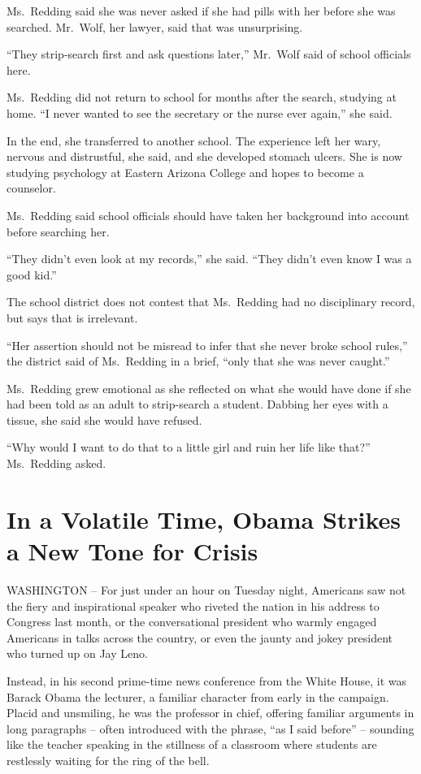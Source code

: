 \documentclass[12pt,a4paper,onecolumn]{article}
\begin{document}
\begin{CJK*}{GBK}{song}
Ms.~Redding said she was never asked if she had pills with her before she was searched. Mr.~Wolf,
her lawyer, said that was unsurprising.

``They strip-search first and ask questions later,'' Mr.~Wolf said of school officials here.

Ms.~Redding did not return to school for months after the search, studying at home. ``I never wanted
to see the secretary or the nurse ever again,'' she said.

In the end, she transferred to another school. The experience left her wary, nervous and
distrustful, she said, and she developed stomach ulcers. She is now studying psychology at Eastern
Arizona College and hopes to become a counselor.

Ms.~Redding said school officials should have taken her background into account before searching
her.

``They didn't even look at my records,'' she said. ``They didn't even know I was a good kid.''

The school district does not contest that Ms.~Redding had no disciplinary record, but says that is
irrelevant.

``Her assertion should not be misread to infer that she never broke school rules,'' the district
said of Ms.~Redding in a brief, ``only that she was never caught.''

Ms.~Redding grew emotional as she reflected on what she would have done if she had been told as an
adult to strip-search a student. Dabbing her eyes with a tissue, she said she would have refused.

``Why would I want to do that to a little girl and ruin her life like that?'' Ms.~Redding asked.

\section{In a Volatile Time, Obama Strikes a New Tone for Crisis}

WASHINGTON -- For just under an hour on Tuesday night, Americans saw not the fiery and inspirational
speaker who riveted the nation in his address to Congress last month, or the conversational
president who warmly engaged Americans in talks across the country, or even the jaunty and jokey
president who turned up on Jay Leno.

Instead, in his second prime-time news conference from the White House, it was Barack Obama the
lecturer, a familiar character from early in the campaign. Placid and unsmiling, he was the
professor in chief, offering familiar arguments in long paragraphs -- often introduced with the
phrase, ``as I said before'' -- sounding like the teacher speaking in the stillness of a classroom
where students are restlessly waiting for the ring of the bell.


\end{CJK*}
\end{document}

